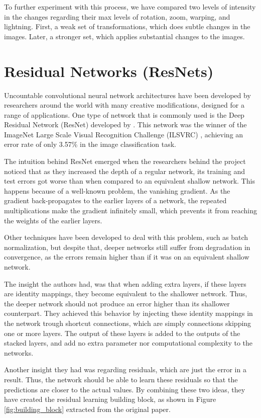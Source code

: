 To further experiment with this process, we have compared two levels of intensity in the changes regarding their max levels of rotation, zoom, warping, and lightning. First, a weak set of transformations, which does subtle changes in the images. Later, a stronger set, which applies substantial changes to the images.

\section{Residual Networks (ResNets)}

Uncountable convolutional neural network architectures have been developed by researchers around the world with many creative modifications, designed for a range of applications. One type of network that is commonly used is the Deep Residual Network (ResNet) developed by \cite{ParkhiVZ15}. This network was the winner of the ImageNet Large Scale Visual Recognition Challenge (ILSVRC) \citep{ILSVRC15}, achieving an error rate of only 3.57\% in the image classification task.

The intuition behind ResNet emerged when the researchers behind the project noticed that as they increased the depth of a regular network, its training and test errors got worse than when compared to an equivalent shallow network. This happens because of a well-known problem, the vanishing gradient. As the gradient back-propagates to the earlier layers of a network, the repeated multiplications make the gradient infinitely small, which prevents it from reaching the weights of the earlier layers.

Other techniques have been developed to deal with this problem, such as batch normalization, but despite that, deeper networks still suffer from degradation in convergence, as the errors remain higher than if it was on an equivalent shallow network.

The insight the authors had, was that when adding extra layers, if these layers are identity mappings, they become equivalent to the shallower network. Thus, the deeper network should not produce an error higher than its shallower counterpart. They achieved this behavior by injecting these identity mappings in the network trough shortcut connections, which are simply connections skipping one or more layers. The output of these layers is added to the outputs of the stacked layers, and add no extra parameter nor computational complexity to the networks.

Another insight they had was regarding residuals, which are just the error in a result. Thus, the network should be able to learn these residuals so that the predictions are closer to the actual values. By combining these two ideas, they have created the residual learning building block, as shown in Figure \ref{fig:building_block} extracted from the original paper.

